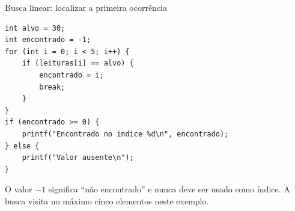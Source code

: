 \begin{frame}[fragile]{Busca linear: localizar a primeira ocorrência}
\begin{lstlisting}
int alvo = 30;
int encontrado = -1;
for (int i = 0; i < 5; i++) {
    if (leituras[i] == alvo) {
        encontrado = i;
        break;
    }
}
if (encontrado >= 0) {
    printf("Encontrado no indice %d\n", encontrado);
} else {
    printf("Valor ausente\n");
}
\end{lstlisting}
\small O valor $-1$ significa ``não encontrado'' e nunca deve ser usado como índice. A busca visita no máximo cinco elementos neste exemplo.
\end{frame}
